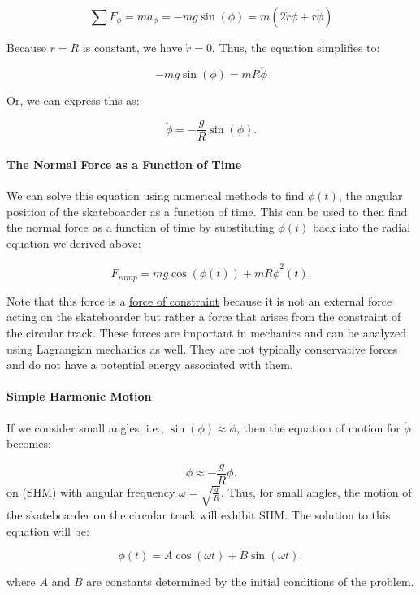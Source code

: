\documentclass[11pt]{article}
\begin{document}
\[\sum F_{\phi} = ma_{\phi} = -mg \sin(\phi) = m\left(2 \dot{r} \dot{\phi} + r \ddot{\phi}\right)\]

Because \(r=R\) is constant, we have \(\dot{r} = 0\). Thus, the equation
simplifies to:

\[-mg \sin(\phi) = mR \ddot{\phi}\]

Or, we can express this as:

\[\ddot{\phi} = -\frac{g}{R} \sin(\phi).\]

\paragraph{The Normal Force as a Function of
Time}\label{the-normal-force-as-a-function-of-time}

We can solve this equation using numerical methods to find \(\phi(t)\),
the angular position of the skateboarder as a function of time. This can
be used to then find the normal force as a function of time by
substituting \(\phi(t)\) back into the radial equation we derived above:

\[F_{ramp} = mg \cos(\phi(t)) + mR \dot{\phi}^2(t).\]

Note that this force is a
\href{https://en.wikipedia.org/wiki/Constraint_force}{force of
constraint} because it is not an external force acting on the
skateboarder but rather a force that arises from the constraint of the
circular track. These forces are important in mechanics and can be
analyzed using Lagrangian mechanics as well. They are not typically
conservative forces and do not have a potential energy associated with
them.

\paragraph{Simple Harmonic Motion}\label{simple-harmonic-motion}

If we consider small angles, i.e., \(\sin(\phi) \approx \phi\), then the
equation of motion for \(\ddot{\phi}\) becomes:

\[\ddot{\phi} \approx -\frac{g}{R} \phi.\] on (SHM) with angular
frequency \(\omega = \sqrt{\frac{g}{R}}\). Thus, for small angles, the
motion of the skateboarder on the circular track will exhibit SHM. The
solution to this equation will be:

\[\phi(t) = A \cos(\omega t) + B \sin(\omega t),\]

where \(A\) and \(B\) are constants determined by the initial conditions
of the problem.
\end{document}

